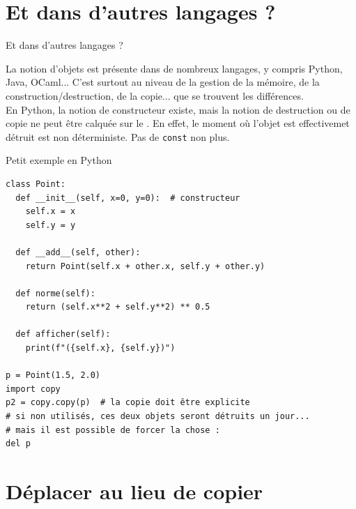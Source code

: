 \documentclass[c]{beamer}
\newcommand{\inline}[1]{\texttt{#1}}
\begin{document}

\part{Et dans d'autres langages ?}
\frame{\partpage}

\begin{frame}[fragile]{Et dans d'autres langages ?}

La notion d'objets est présente dans de nombreux langages, y compris Python, Java, OCaml... C'est surtout au niveau de la gestion de la mémoire, de la construction/destruction, de la copie... que se trouvent les différences.\\

En Python, la notion de constructeur existe, mais la notion de destruction ou de copie ne peut être calquée sur le \Cpp. En effet, le moment où l'objet est effectivemet détruit est non déterministe. Pas de \inline{const} non plus.\\

\end{frame}

\begin{frame}[fragile]{Petit exemple en Python}

\begin{verbatim}
class Point:
  def __init__(self, x=0, y=0):  # constructeur
    self.x = x
    self.y = y

  def __add__(self, other):
    return Point(self.x + other.x, self.y + other.y)

  def norme(self):
    return (self.x**2 + self.y**2) ** 0.5

  def afficher(self):
    print(f"({self.x}, {self.y})")

p = Point(1.5, 2.0)
import copy
p2 = copy.copy(p)  # la copie doit être explicite
# si non utilisés, ces deux objets seront détruits un jour...
# mais il est possible de forcer la chose :
del p
\end{verbatim}

\end{frame}


\part{Déplacer au lieu de copier}
\frame{\partpage}
\end{document}

